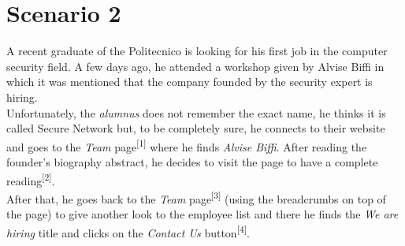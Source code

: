 \documentclass[12pt]{report}
\begin{document}
\section{Scenario 2}
A recent graduate of the Politecnico is looking for his first job in the computer security field.
A few days ago, he attended a workshop given by Alvise Biffi in which it was mentioned that the company founded by the security expert is hiring.\\
\noindent
Unfortunately, the \emph{alumnus} does not remember the exact name, he thinks it is called Secure Network but, to be completely sure, he connects to their website and goes to the \emph{Team} page\textsuperscript{[1]} where he finds \emph{Alvise Biffi}.
After reading the founder's biography abstract, he decides to visit the page to have a complete reading\textsuperscript{[2]}. 
\\
\noindent
After that, he goes back to the \emph{Team} page\textsuperscript{[3]} (using the breadcrumbs on top of the page) to give another look to the employee list and there he finds the \emph{We are hiring} title and clicks on the \emph{Contact Us} button\textsuperscript{[4]}.
\end{document}
